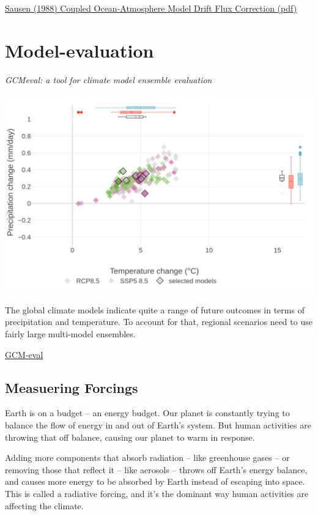 \documentclass[
]{book}
\begin{document}
\href{pdf/Barthel_1988_Coupled_ocean_atmosphere_models_with_flux_corection.pdf}{Sausen (1988) Coupled Ocean-Atmosphere Model Drift Flux Correction (pdf)}

\hypertarget{model-evaluation}{%
\section{Model-evaluation}\label{model-evaluation}}

\emph{GCMeval: a tool for climate model ensemble evaluation}

\includegraphics{fig/GCMevalNorthEuropeBestModels.png}

The global climate models indicate quite a range of future outcomes in terms of
precipitation and temperature.
To account for that, regional scenarios need to use fairly large multi-model ensembles.

\href{https://gcmeval.met.no/}{GCM-eval}

\hypertarget{measuering-forcings}{%
\subsection{Measuering Forcings}\label{measuering-forcings}}

Earth is on a budget -- an energy budget. Our planet is constantly trying to balance the flow of energy in and out of Earth's system. But human activities are throwing that off balance, causing our planet to warm in response.

Adding more components that absorb radiation -- like greenhouse gases -- or removing those that reflect it -- like aerosols -- throws off Earth's energy balance, and causes more energy to be absorbed by Earth instead of escaping into space. This is called a radiative forcing, and it's the dominant way human activities are affecting the climate.
\end{document}
